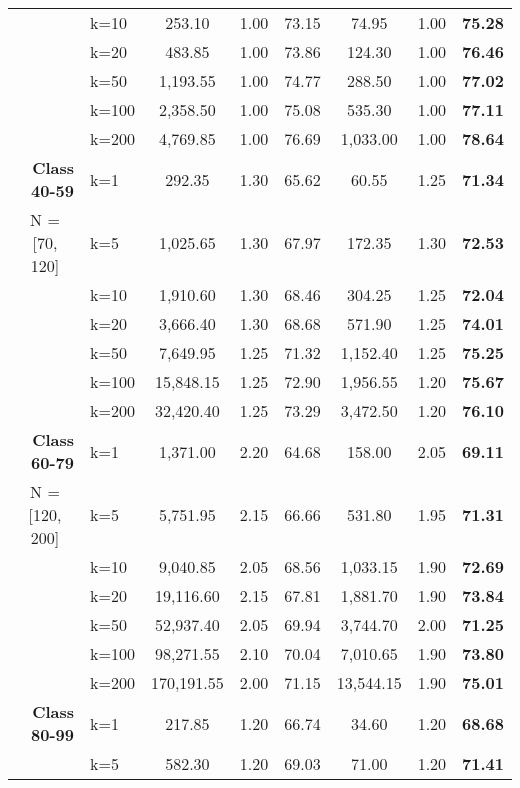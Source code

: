 \begin{table}[htbp]
\begin{tabular}{|l|l|c|c|c|c|c|c|}
     & k=10 & 253.10 & 1.00 & 73.15 & 74.95 & 1.00 & \textbf{75.28} \\ 
     & k=20 & 483.85 & 1.00 & 73.86 & 124.30 & 1.00 & \textbf{76.46} \\ 
     & k=50 & 1,193.55 & 1.00 & 74.77 & 288.50 & 1.00 & \textbf{77.02} \\ 
     & k=100 & 2,358.50 & 1.00 & 75.08 & 535.30 & 1.00 & \textbf{77.11} \\ 
     & k=200 & 4,769.85 & 1.00 & 76.69 & 1,033.00 & 1.00 & \textbf{78.64} \\ \hline
    \multicolumn{1}{|r|}{\textbf{Class 40-59}} & k=1 & 292.35 & 1.30 & 65.62 & 60.55 & 1.25 & \textbf{71.34} \\ 
    \multicolumn{1}{|c|}{N = [70, 120]} & k=5 & 1,025.65 & 1.30 & 67.97 & 172.35 & 1.30 & \textbf{72.53} \\ 
     & k=10 & 1,910.60 & 1.30 & 68.46 & 304.25 & 1.25 & \textbf{72.04} \\ 
     & k=20 & 3,666.40 & 1.30 & 68.68 & 571.90 & 1.25 & \textbf{74.01} \\ 
     & k=50 & 7,649.95 & 1.25 & 71.32 & 1,152.40 & 1.25 & \textbf{75.25} \\ 
     & k=100 & 15,848.15 & 1.25 & 72.90 & 1,956.55 & 1.20 & \textbf{75.67} \\ 
     & k=200 & 32,420.40 & 1.25 & 73.29 & 3,472.50 & 1.20 & \textbf{76.10} \\ \hline
    \multicolumn{1}{|r|}{\textbf{Class 60-79}} & k=1 & 1,371.00 & 2.20 & 64.68 & 158.00 & 2.05 & \textbf{69.11} \\ 
    \multicolumn{1}{|c|}{N = [120, 200]} & k=5 & 5,751.95 & 2.15 & 66.66 & 531.80 & 1.95 & \textbf{71.31} \\ 
     & k=10 & 9,040.85 & 2.05 & 68.56 & 1,033.15 & 1.90 & \textbf{72.69} \\ 
     & k=20 & 19,116.60 & 2.15 & 67.81 & 1,881.70 & 1.90 & \textbf{73.84} \\ 
     & k=50 & 52,937.40 & 2.05 & 69.94 & 3,744.70 & 2.00 & \textbf{71.25} \\ 
     & k=100 & 98,271.55 & 2.10 & 70.04 & 7,010.65 & 1.90 & \textbf{73.80} \\ 
     & k=200 & 170,191.55 & 2.00 & 71.15 & 13,544.15 & 1.90 & \textbf{75.01} \\ \hline
    \multicolumn{1}{|r|}{\textbf{Class 80-99}} & k=1 & 217.85 & 1.20 & 66.74 & 34.60 & 1.20 & \textbf{68.68} \\ 
     & k=5 & 582.30 & 1.20 & 69.03 & 71.00 & 1.20 & \textbf{71.41} \\ 

\end{tabular}
\end{table}
